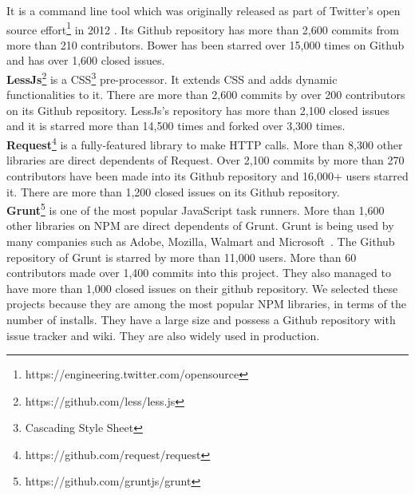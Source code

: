 It is a command line tool which was originally released as part of Twitter's open source effort\footnote{https://engineering.twitter.com/opensource} in 2012 \cite{bowerabout}. Its Github repository has more than 2,600 commits from more than 210 contributors. Bower has been starred over 15,000 times on Github and has over 1,600 closed issues.\\ \textbf{LessJs}\footnote{https://github.com/less/less.js} is a CSS\footnote{Cascading Style Sheet} pre-processor. It extends CSS and adds dynamic functionalities to it. There are more than 2,600 commits by over 200 contributors on its Github repository. LessJs's repository has more than 2,100 closed issues and it is starred more than 14,500 times and forked over 3,300 times.\\ \textbf{Request}\footnote{https://github.com/request/request} is a fully-featured library to make HTTP calls. More than 8,300 other libraries are direct dependents of Request. Over 2,100 commits by more than 270 contributors have been made into its Github repository and 16,000+ users starred it. There are more than 1,200 closed issues on its Github repository.\\ \textbf{Grunt}\footnote{https://github.com/gruntjs/grunt} is one of the most popular JavaScript task runners. More than 1,600 other libraries on NPM are direct dependents of Grunt. Grunt is being used by many companies such as Adobe, Mozilla, Walmart and Microsoft~\cite{gruntusers}. The Github repository of Grunt is starred by more than 11,000 users. More than 60 contributors made over 1,400 commits into this project. They also managed to have more than 1,000 closed issues on their github repository. We selected these projects because they are among the most popular NPM libraries, in terms of the number of installs. They have a large size and possess a Github repository with issue tracker and wiki. They are also widely used in production.\\
